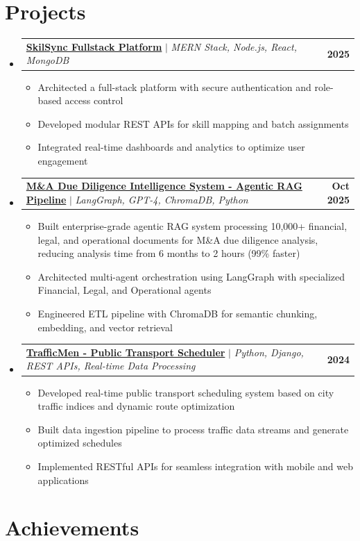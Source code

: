 \documentclass[letterpaper,11pt]{article}
\makeatletter
\newcommand{\resumeItem}[1]{
  \item\small{
    {#1 \vspace{-2pt}}
  }
}
\newcommand{\resumeProjectHeading}[2]{
    \item
    \begin{tabular*}{1.001\textwidth}{l@{\extracolsep{\fill}}r}
      \small#1 & \textbf{\small #2}\\
    \end{tabular*}\vspace{-7pt}
}
\newcommand{\resumeSubHeadingListStart}{\begin{itemize}[leftmargin=0.0in, label={}]}
\newcommand{\resumeSubHeadingListEnd}{\end{itemize}}
\newcommand{\resumeItemListStart}{\begin{itemize}}
\newcommand{\resumeItemListEnd}{\end{itemize}\vspace{-5pt}}
\makeatother
\begin{document}
\section{Projects}
    \resumeSubHeadingListStart
      \resumeProjectHeading
          {\textbf{\href{https://github.com/HIRU-VIRU/skil-sync-fullstack/}{SkilSync Fullstack Platform}} $|$ \emph{MERN Stack, Node.js, React, MongoDB}}{2025}
          \resumeItemListStart
            \resumeItem{Architected a full-stack platform with secure authentication and role-based access control}
            \resumeItem{Developed modular REST APIs for skill mapping and batch assignments}
            \resumeItem{Integrated real-time dashboards and analytics to optimize user engagement}
          \resumeItemListEnd 
          \vspace{-13pt}
      \resumeProjectHeading
          {\textbf{\href{https://github.com/HIRU-VIRU/M-A_analysis_rag}{M\&A Due Diligence Intelligence System - Agentic RAG Pipeline}} $|$ \emph{LangGraph, GPT-4, ChromaDB, Python}}{Oct 2025}
          \resumeItemListStart
            \resumeItem{Built enterprise-grade agentic RAG system processing 10,000+ financial, legal, and operational documents for M\&A due diligence analysis, reducing analysis time from 6 months to 2 hours (99\% faster)}
            \resumeItem{Architected multi-agent orchestration using LangGraph with specialized Financial, Legal, and Operational agents}
            \resumeItem{Engineered ETL pipeline with ChromaDB for semantic chunking, embedding, and vector retrieval}
          \resumeItemListEnd
          \vspace{-13pt}
      \resumeProjectHeading
          {\textbf{\href{https://github.com/HIRU-VIRU/traffic-men}{TrafficMen - Public Transport Scheduler}} $|$ \emph{Python, Django, REST APIs, Real-time Data Processing}}{2024}
          \resumeItemListStart
            \resumeItem{Developed real-time public transport scheduling system based on city traffic indices and dynamic route optimization}
            \resumeItem{Built data ingestion pipeline to process traffic data streams and generate optimized schedules}
            \resumeItem{Implemented RESTful APIs for seamless integration with mobile and web applications}
          \resumeItemListEnd 
          \vspace{-13pt}
    \resumeSubHeadingListEnd


\section{Achievements}
\end{document}
